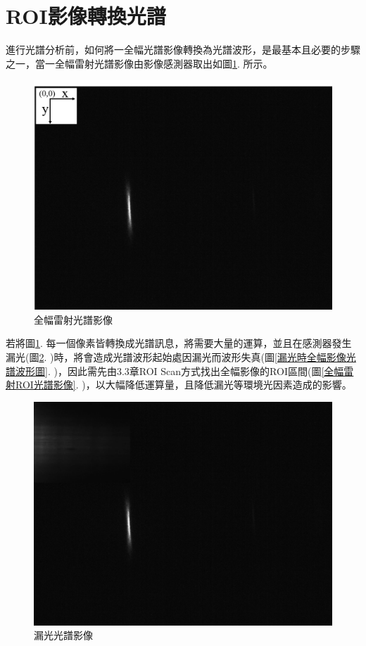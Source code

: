\section{ROI影像轉換光譜}
進行光譜分析前，如何將一全幅光譜影像轉換為光譜波形，是最基本且必要的步驟之一，當一全幅雷射光譜影像由影像感測器取出如圖\ref{全幅雷射光譜影像}. 所示。
\begin{figure}[H] %
	\centering %
	\vspace{0.8cm}
	\includegraphics[width=13cm]{figures/TEST_0303_Image__Laser2_2021-03-03-14-23-20.png} %
	\caption{全幅雷射光譜影像} %
	\label{全幅雷射光譜影像} %
\end{figure}
若將圖\ref{全幅雷射光譜影像}. 每一個像素皆轉換成光譜訊息，將需要大量的運算，並且在感測器發生漏光(圖\ref{漏光光譜影像}. )時，將會造成光譜波形起始處因漏光而波形失真(圖\ref{漏光時全幅影像光譜波形圖}. )，因此需先由3.3章ROI Scan方式找出全幅影像的ROI區間(圖\ref{全幅雷射ROI光譜影像}. )，以大幅降低運算量，且降低漏光等環境光因素造成的影響。
\begin{figure}[H] %
	\centering %
	\includegraphics[width=13cm]{figures/漏光影像.png} %
	\caption{漏光光譜影像} %
	\label{漏光光譜影像} %
\end{figure}
